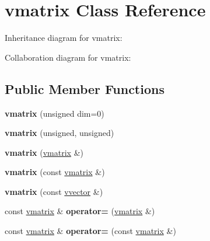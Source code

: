 \hypertarget{classvmatrix}{}\section{vmatrix Class Reference}
\label{classvmatrix}


Inheritance diagram for vmatrix\+:


Collaboration diagram for vmatrix\+:
\subsection*{Public Member Functions}
\begin{DoxyCompactItemize}
\item 
{\bfseries vmatrix} (unsigned dim=0)\hypertarget{classvmatrix_aaf28743bfd36da5a21ea42e1eed9ab0d}{}\label{classvmatrix_aaf28743bfd36da5a21ea42e1eed9ab0d}

\item 
{\bfseries vmatrix} (unsigned, unsigned)\hypertarget{classvmatrix_a75aa442eef6bb651719fbf4b7f740efb}{}\label{classvmatrix_a75aa442eef6bb651719fbf4b7f740efb}

\item 
{\bfseries vmatrix} (\hyperlink{classvmatrix}{vmatrix} \&)\hypertarget{classvmatrix_a89c5fddf4b49c66b5984110fc41a0246}{}\label{classvmatrix_a89c5fddf4b49c66b5984110fc41a0246}

\item 
{\bfseries vmatrix} (const \hyperlink{classvmatrix}{vmatrix} \&)\hypertarget{classvmatrix_ad4cedcb7adb6b8bb734585229762b25a}{}\label{classvmatrix_ad4cedcb7adb6b8bb734585229762b25a}

\item 
{\bfseries vmatrix} (const \hyperlink{classvvector}{vvector} \&)\hypertarget{classvmatrix_a96bd38680bde1c61fde8d34845a2f8a5}{}\label{classvmatrix_a96bd38680bde1c61fde8d34845a2f8a5}

\item 
const \hyperlink{classvmatrix}{vmatrix} \& {\bfseries operator=} (\hyperlink{classvmatrix}{vmatrix} \&)\hypertarget{classvmatrix_a0b6354c7fb81a2eb632b467e69b3a35b}{}\label{classvmatrix_a0b6354c7fb81a2eb632b467e69b3a35b}

\item 
const \hyperlink{classvmatrix}{vmatrix} \& {\bfseries operator=} (const \hyperlink{classvmatrix}{vmatrix} \&)\hypertarget{classvmatrix_ad5d7daa8a7bbddc59713daf4f43e5038}{}\label{classvmatrix_ad5d7daa8a7bbddc59713daf4f43e5038}


\end{DoxyCompactItemize}
